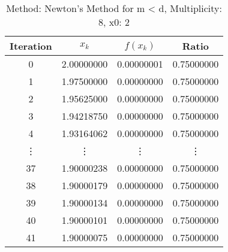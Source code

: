 \begin{table}
\centering
\caption{Method: Newton's Method for m < d, Multiplicity: 8, x0: 2}
\label{tab:table_Newton's_Method_for_m_<_d_8_2}
\begin{tabular}{c c c c}
\toprule
Iteration &      $x_k$ &   $f(x_k)$ &      Ratio \\
\midrule
        0 & 2.00000000 & 0.00000001 & 0.75000000 \\
        1 & 1.97500000 & 0.00000000 & 0.75000000 \\
        2 & 1.95625000 & 0.00000000 & 0.75000000 \\
        3 & 1.94218750 & 0.00000000 & 0.75000000 \\
        4 & 1.93164062 & 0.00000000 & 0.75000000 \\
   \vdots &     \vdots &     \vdots &     \vdots \\
       37 & 1.90000238 & 0.00000000 & 0.75000000 \\
       38 & 1.90000179 & 0.00000000 & 0.75000000 \\
       39 & 1.90000134 & 0.00000000 & 0.75000000 \\
       40 & 1.90000101 & 0.00000000 & 0.75000000 \\
       41 & 1.90000075 & 0.00000000 & 0.75000000 \\
\bottomrule
\end{tabular}
\end{table}
